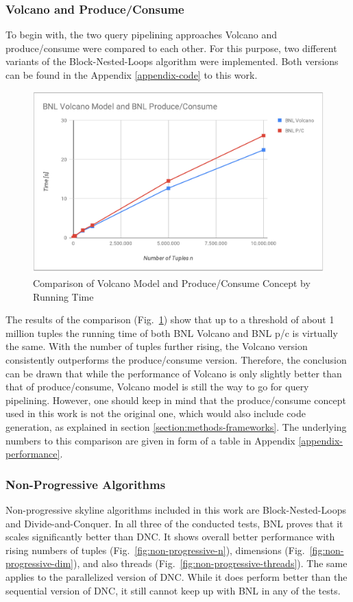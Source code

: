 \subsubsection{Volcano and Produce/Consume} \label{section:models-test-comparison}
To begin with, the two query pipelining approaches Volcano and produce/consume were compared to each other. For this purpose, two different variants of the Block-Nested-Loops algorithm were implemented. Both versions can be found in the Appendix \ref{appendix-code} to this work. 
\begin{figure}[h]
	\centering
	\includegraphics[width=1\linewidth]{figures/im-vs-pc}
	\caption{Comparison of Volcano Model and Produce/Consume Concept by Running Time}
	\label{fig:im-vs-pc}
\end{figure}
The results of the comparison (Fig.~\ref{fig:im-vs-pc}) show that up to a threshold of about 1 million tuples the running time of both BNL Volcano and BNL p/c is virtually the same. With the number of tuples further rising, the Volcano version consistently outperforms the produce/consume version. Therefore, the conclusion can be drawn that while the performance of Volcano is only slightly better than that of produce/consume, Volcano model is still the way to go for query pipelining. However, one should keep in mind that the produce/consume concept used in this work is not the original one, which would also include code generation, as explained in section \ref{section:methods-frameworks}. 
The underlying numbers to this comparison are given in form of a table in Appendix \ref{appendix-performance}. 

\subsubsection{Non-Progressive Algorithms}
Non-progressive skyline algorithms included in this work are Block-Nested-Loops and Divide-and-Conquer. In all three of the conducted tests, BNL proves that it scales significantly better than DNC. It shows overall better performance with rising numbers of tuples (Fig.~\ref{fig:non-progressive-n}), dimensions (Fig.~\ref{fig:non-progressive-dim}), and also threads (Fig.~\ref{fig:non-progressive-threads}). The same applies to the parallelized version of DNC. While it does perform better than the sequential version of DNC, it still cannot keep up with BNL in any of the tests. 

